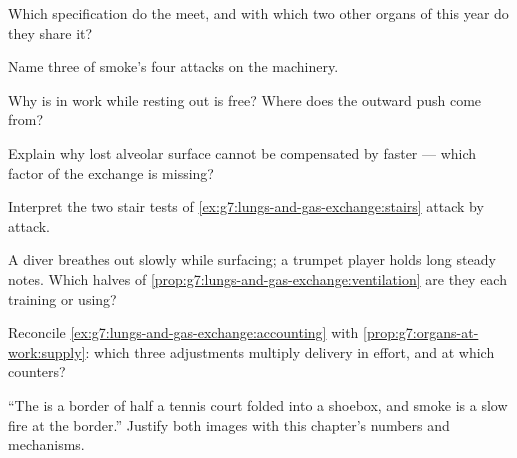 \begin{exercise}[$\star$]\label{exo:g7:lungs-and-gas-exchange:5}
Which specification do the  meet, and with which
two other organs of this year do they share it?
\end{exercise}

\begin{exercise}[$\star$]\label{exo:g7:lungs-and-gas-exchange:6}
Name three of smoke's four attacks on the machinery.
\end{exercise}

\begin{exercise}[$\star\star$]\label{exo:g7:lungs-and-gas-exchange:7}
Why is  in work while resting  out is
free? Where does the outward push come from?
\end{exercise}

\begin{exercise}[$\star\star$]\label{exo:g7:lungs-and-gas-exchange:8}
Explain why lost alveolar surface cannot be compensated
by  faster --- which factor of the exchange is
missing?
\end{exercise}

\begin{exercise}[$\star\star$]\label{exo:g7:lungs-and-gas-exchange:9}
Interpret the two stair tests of
\cref{ex:g7:lungs-and-gas-exchange:stairs} attack by
attack.
\end{exercise}

\begin{exercise}[$\star\star$]\label{exo:g7:lungs-and-gas-exchange:10}
A diver breathes out slowly while surfacing; a trumpet
player holds long steady notes. Which halves of
\cref{prop:g7:lungs-and-gas-exchange:ventilation} are
they each training or using?
\end{exercise}

\begin{exercise}[$\star\star$]\label{exo:g7:lungs-and-gas-exchange:11}
Reconcile \cref{ex:g7:lungs-and-gas-exchange:accounting}
with \cref{prop:g7:organs-at-work:supply}: which three
adjustments multiply delivery in effort, and at which
counters?
\end{exercise}

\begin{exercise}[$\star\star\star$]\label{exo:g7:lungs-and-gas-exchange:12}
``The  is a border of half a tennis court folded
into a shoebox, and smoke is a slow fire at the
border.'' Justify both images with this chapter's
numbers and mechanisms.
\end{exercise}

